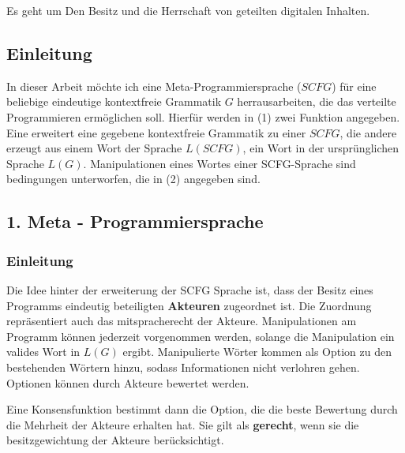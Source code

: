 \documentclass[]{article}
\author{}
\date{}
\begin{document}
Es geht um Den Besitz und die Herrschaft von geteilten digitalen Inhalten. 

\subsection{Einleitung}


In dieser Arbeit möchte ich eine Meta-Programmiersprache
(\textbf{$SCFG$}) für eine beliebige eindeutige kontextfreie Grammatik
$G$ herrausarbeiten, die das verteilte Programmieren ermöglichen soll.
Hierfür werden in (1) zwei Funktion angegeben. Eine erweitert eine
gegebene kontextfreie Grammatik zu einer $SCFG$, die andere erzeugt aus
einem Wort der Sprache $L(SCFG)$, ein Wort in der ursprünglichen Sprache
$L(G)$. Manipulationen eines Wortes einer SCFG-Sprache sind bedingungen
unterworfen, die in (2) angegeben sind.



\subsection{1. Meta - Programmiersprache}

\subsubsection{Einleitung}


Die Idee hinter der erweiterung der SCFG Sprache ist, dass der Besitz
eines Programms eindeutig beteiligten \textbf{Akteuren} zugeordnet ist. Die
Zuordnung repräsentiert auch das mitspracherecht der Akteure.
Manipulationen am Programm können jederzeit vorgenommen werden, solange die Manipulation ein valides Wort in $L(G)$ ergibt. Manipulierte Wörter kommen als Option zu den bestehenden Wörtern hinzu, sodass Informationen nicht verlohren gehen.
Optionen können durch Akteure bewertet werden.

Eine Konsensfunktion bestimmt dann die Option, die die beste Bewertung durch die Mehrheit der Akteure erhalten hat. Sie gilt als \textbf{gerecht}, wenn sie die besitzgewichtung der Akteure berücksichtigt.

\end{document}

